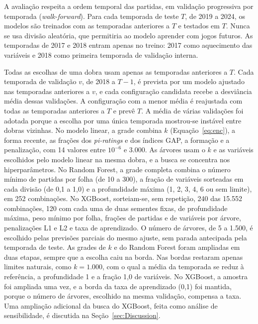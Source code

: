 A avaliação respeita a ordem temporal das partidas, em validação progressiva por temporada (\textit{walk-forward}). Para cada temporada de teste $T$, de 2019 a 2024, os modelos são treinados com as temporadas anteriores a $T$ e testados em $T$. Nunca se usa divisão aleatória, que permitiria ao modelo aprender com jogos futuros. As temporadas de 2017 e 2018 entram apenas no treino: 2017 como aquecimento das variáveis e 2018 como primeira temporada de validação interna.

Todas as escolhas de uma dobra usam apenas as temporadas anteriores a $T$. Cada temporada de validação $v$, de 2018 a $T-1$, é prevista por um modelo ajustado nas temporadas anteriores a $v$, e cada configuração candidata recebe a desviância média dessas validações. A configuração com a menor média é reajustada com todas as temporadas anteriores a $T$ e prevê $T$. A média de várias validações foi adotada porque a escolha por uma única temporada mostrou-se instável entre dobras vizinhas. No modelo linear, a grade combina $k$ (Equação~\ref{eq:enc}), a forma recente, as frações dos \textit{pi-ratings} e dos índices GAP, a formação e a penalização, com 14 valores entre $10^{-6}$ e 3.000. As árvores usam o $k$ e as variáveis escolhidos pelo modelo linear na mesma dobra, e a busca se concentra nos hiperparâmetros. No Random Forest, a grade completa combina o número mínimo de partidas por folha (de 10 a 300), a fração de variáveis sorteadas em cada divisão (de 0,1 a 1,0) e a profundidade máxima (1, 2, 3, 4, 6 ou sem limite), em 252 combinações. No XGBoost, sorteiam-se, sem repetição, 240 das 15.552 combinações, 120 com cada uma de duas sementes fixas, de profundidade máxima, peso mínimo por folha, frações de partidas e de variáveis por árvore, penalizações L1 e L2 e taxa de aprendizado. O número de árvores, de 5 a 1.500, é escolhido pelas previsões parciais do mesmo ajuste, sem parada antecipada pela temporada de teste. As grades de $k$ e do Random Forest foram ampliadas em duas etapas, sempre que a escolha caiu na borda. Nas bordas restaram apenas limites naturais, como $k = 1.000$, com o qual a média da temporada se reduz à referência, a profundidade 1 e a fração 1,0 de variáveis. No XGBoost, a amostra foi ampliada uma vez, e a borda da taxa de aprendizado (0,1) foi mantida, porque o número de árvores, escolhido na mesma validação, compensa a taxa. Uma ampliação adicional da busca do XGBoost, feita como análise de sensibilidade, é discutida na Seção~\ref{sec:Discussion}.

